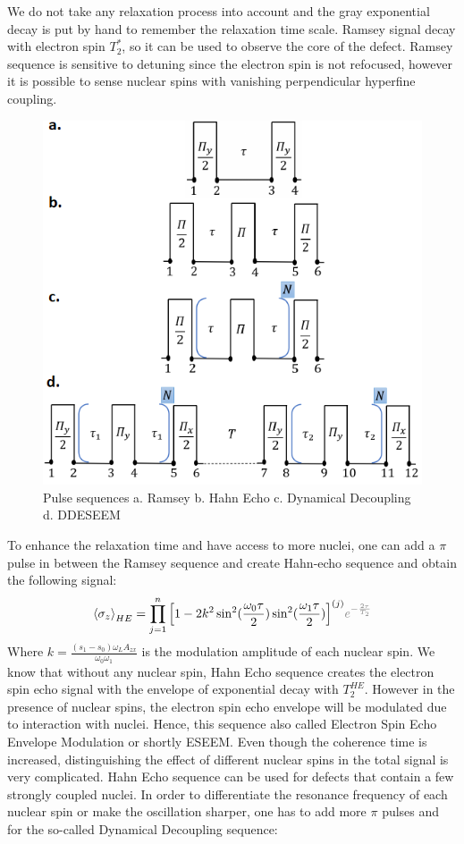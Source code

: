 \documentclass[%
 reprint,
superscriptaddress,
 amsmath,amssymb,
 aps,
]{revtex4-2}
\begin{document}
We do not take any relaxation process into account and the gray exponential decay is put by hand to remember the relaxation time scale. Ramsey signal decay with electron spin $T_2^\ast$, so it can be used to observe the core of the defect. Ramsey sequence is sensitive to detuning since the electron spin is not refocused, however it is possible to sense nuclear spins with vanishing perpendicular hyperfine coupling.\\
\begin{figure}%
	\begin{center}
		\includegraphics[width=0.9\columnwidth]{pict/seqs.png}
		\caption{Pulse sequences a. Ramsey b. Hahn Echo c. Dynamical Decoupling d. DDESEEM}
		\label{fig:seqs}
	\end{center}
\end{figure} 
To enhance the relaxation time and have access to more nuclei, one can add a $\pi$ pulse in between the Ramsey sequence and create Hahn-echo sequence and obtain the following signal:
\begin{gather}
	\expval{\sigma_z}_{HE} = \prod_{j=1}^n \Big[1 - 2 k^2 
	\sin^2(\frac{\omega_0 \tau}{2}) \sin^2(\frac{\omega_1 \tau}{2})\Big]^{(j)} \textcolor{gray}{ e^{-\frac{2\tau}{T_2}}}
\end{gather}
Where $k = \frac{(s_1-s_0)\omega_L A_{zx}}{\omega_0 \omega_1}$ is the modulation amplitude of each nuclear spin. We know that without any nuclear spin, Hahn Echo sequence creates the electron spin echo signal with the envelope of exponential decay with $T_2^{HE}$. However in the presence of nuclear spins, the electron spin echo envelope will be modulated due to interaction with nuclei. Hence, this sequence also called Electron Spin Echo Envelope Modulation or shortly ESEEM. Even though the coherence time is increased, distinguishing the effect of different nuclear spins in the total signal is very complicated. Hahn Echo sequence can be used for defects that contain a few strongly coupled nuclei. In order to differentiate the resonance frequency of each nuclear spin or make the oscillation sharper, one has to add more $\pi$ pulses and for the so-called Dynamical Decoupling sequence:
\end{document}
